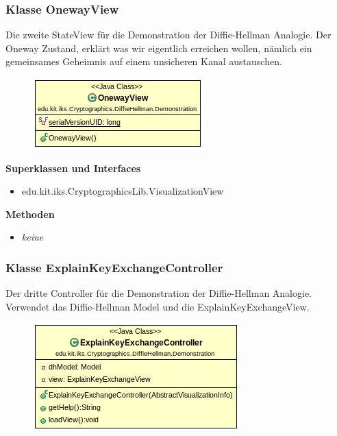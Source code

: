 \documentclass{article}
\begin{document}
\subsubsection{Klasse OnewayView}
      Die zweite StateView für die Demonstration der Diffie-Hellman Analogie.
      Der Oneway Zustand, erklärt was wir eigentlich erreichen wollen,
      nämlich ein gemeinsames Geheimnis auf einem unsicheren Kanal austauschen.

      \begin{figure}[H]
        \centering
        \includegraphics{resources/edu-kit-iks-Cryptographics-DiffieHellman-Demonstration-OnewayView}
      \end{figure}

      \textbf{Superklassen und Interfaces}
      \begin{itemize}
        \item edu.kit.iks.CryptographicsLib.VisualizationView
      \end{itemize}

      \textbf{Methoden}
      \begin{itemize}
        \item \textit{keine}
      \end{itemize}

\subsubsection{Klasse ExplainKeyExchangeController}
      Der dritte Controller für die Demonstration der Diffie-Hellman Analogie.
      Verwendet das Diffie-Hellman Model und die ExplainKeyExchangeView.

      \begin{figure}[H]
        \centering
        \includegraphics{resources/edu-kit-iks-Cryptographics-DiffieHellman-Demonstration-ExplainKeyExchangeController}
      \end{figure}
\end{document}
